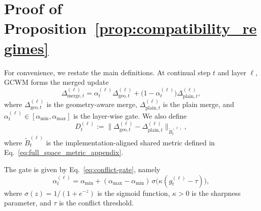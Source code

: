 \documentclass{article}
\begin{document}

\section{Proof of Proposition~\ref{prop:compatibility_regimes}}
\label{app:proof_compatibility_regimes}

For convenience, we restate the main definitions. At continual step \(t\) and layer \(\ell\), GCWM forms the merged update
\begin{equation}
\Delta_{\mathrm{merge},t}^{(\ell)}
=
\alpha_t^{(\ell)} \Delta_{\mathrm{geo},t}^{(\ell)}
+
\bigl(1-\alpha_t^{(\ell)}\bigr)\Delta_{\mathrm{plain},t}^{(\ell)},
\label{eq:prop1_blend_appendix}
\end{equation}
where \(\Delta_{\mathrm{geo},t}^{(\ell)}\) is the geometry-aware merge, \(\Delta_{\mathrm{plain},t}^{(\ell)}\) is the plain merge, and \(\alpha_t^{(\ell)} \in [\alpha_{\min},\alpha_{\max}]\) is the layer-wise gate. We also define
\begin{equation}
D_t^{(\ell)}
:=
\bigl\|
\Delta_{\mathrm{geo},t}^{(\ell)}-\Delta_{\mathrm{plain},t}^{(\ell)}
\bigr\|_{\widetilde B_t^{(\ell)}},
\label{eq:prop1_D_appendix}
\end{equation}
where \(\widetilde B_t^{(\ell)}\) is the implementation-aligned shared metric defined in Eq.~\eqref{eq:full_space_metric_appendix}.

The gate is given by Eq.~\eqref{eq:conflict-gate}, namely
\begin{equation}
\alpha_t^{(\ell)}
=
\alpha_{\min}
+
(\alpha_{\max}-\alpha_{\min})
\,\sigma\!\bigl(\kappa(g_t^{(\ell)}-\tau)\bigr),
\label{eq:prop1_gate_appendix}
\end{equation}
where \(\sigma(z)=1/(1+e^{-z})\) is the sigmoid function, \(\kappa>0\) is the sharpness parameter, and \(\tau\) is the conflict threshold.
\end{document}
